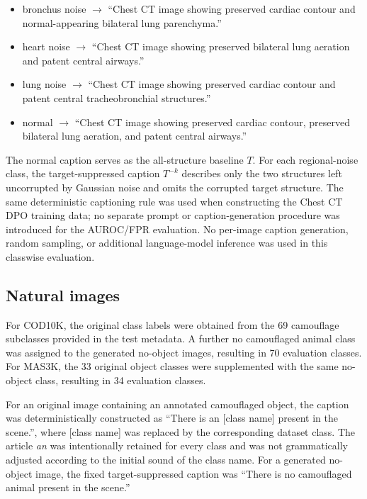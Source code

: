 \begin{itemize}
  \item bronchus noise $\rightarrow$ ``Chest CT image showing preserved cardiac contour and normal-appearing bilateral lung parenchyma.''
  \item heart noise $\rightarrow$ ``Chest CT image showing preserved bilateral lung aeration and patent central airways.''
  \item lung noise $\rightarrow$ ``Chest CT image showing preserved cardiac contour and patent central tracheobronchial structures.''
  \item normal $\rightarrow$ ``Chest CT image showing preserved cardiac contour, preserved bilateral lung aeration, and patent central airways.''
\end{itemize}

The normal caption serves as the all-structure baseline $T$. For each regional-noise class, the target-suppressed caption $T^{-k}$ describes only the two structures left uncorrupted by Gaussian noise and omits the corrupted target structure. The same deterministic captioning rule was used when constructing the Chest CT DPO training data; no separate prompt or caption-generation procedure was introduced for the AUROC/FPR evaluation. No per-image caption generation, random sampling, or additional language-model inference was used in this classwise evaluation.

\subsection{Natural images}

For COD10K, the original class labels were obtained from the 69 camouflage subclasses provided in the test metadata. A further no camouflaged animal class was assigned to the generated no-object images, resulting in 70 evaluation classes. For MAS3K, the 33 original object classes were supplemented with the same no-object class, resulting in 34 evaluation classes.

For an original image containing an annotated camouflaged object, the caption was deterministically constructed as ``There is an [class name] present in the scene.'', where [class name] was replaced by the corresponding dataset class. The article \emph{an} was intentionally retained for every class and was not grammatically adjusted according to the initial sound of the class name. For a generated no-object image, the fixed target-suppressed caption was ``There is no camouflaged animal present in the scene.''

